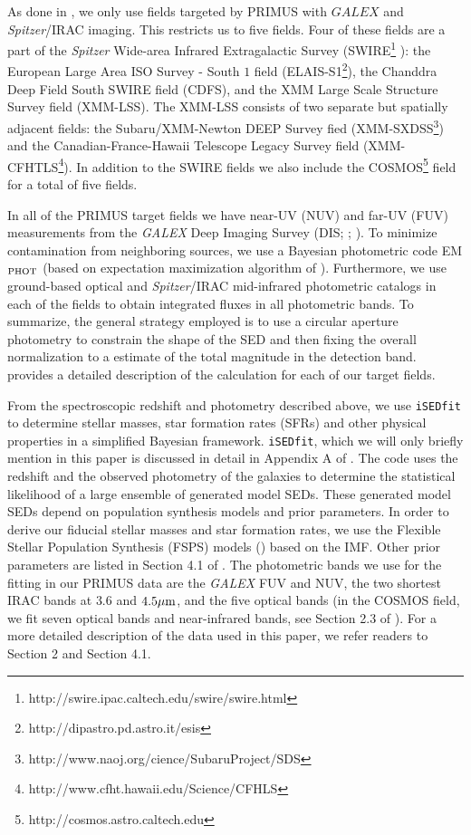 \documentclass{emulateapj}
\begin{document}
As done in \cite{Moustakas:2013aa}, we only use fields targeted by PRIMUS with $GALEX$ and {\em Spitzer}/IRAC imaging.
This restricts us to five fields.
Four of these fields are a part of the {\em Spitzer} Wide-area Infrared Extragalactic Survey (SWIRE\footnote{http://swire.ipac.caltech.edu/swire/swire.html} ): 
the European Large Area ISO Survey - South $1$ field (ELAIS-S1\footnote{http://dipastro.pd.astro.it/esis}), the Chanddra Deep Field South SWIRE field (CDFS), 
and the XMM Large Scale Structure Survey field (XMM-LSS).
The XMM-LSS consists of two separate but spatially adjacent fields: the Subaru/XMM-Newton DEEP Survey fied (XMM-SXDSS\footnote{http://www.naoj.org/cience/SubaruProject/SDS})
and the Canadian-France-Hawaii Telescope Legacy Survey field (XMM-CFHTLS\footnote{http://www.cfht.hawaii.edu/Science/CFHLS}).
In addition to the SWIRE fields we also include the COSMOS\footnote{http://cosmos.astro.caltech.edu} field for a total of five fields. 

In all of the PRIMUS target fields we have near-UV (NUV) and far-UV (FUV) measurements from the {\em GALEX} Deep Imaging Survey (DIS; \cite{Martin:2005aa}; \cite{Morrissey:2005aa}). 
To minimize contamination from neighboring sources, we use a Bayesian photometric code EM$_{\rm{PHOT}}$ (based on expectation maximization algorithm of \cite{Guillaume:2006aa}). 
Furthermore, we use ground-based optical and {\em Spitzer}/IRAC mid-infrared photometric catalogs in each of the fields to obtain integrated fluxes in all 
photometric bands.
To summarize, the general strategy employed is to use a circular aperture photometry to constrain the shape of the SED and then fixing the overall normalization to 
a estimate of the total magnitude in the detection band. 
\cite{Moustakas:2013aa} provides a detailed description of the calculation for each of our target fields.  

From the spectroscopic redshift and photometry described above, we use \texttt{iSEDfit} to determine stellar masses, star formation rates (SFRs) and other physical properties
in a simplified Bayesian framework.
\texttt{iSEDfit}, which we will only briefly mention in this paper is discussed in detail in Appendix A of \cite{Moustakas:2013aa}.
The code uses the redshift and the observed photometry of the galaxies to determine the statistical likelihood of a large ensemble of generated model SEDs. 
These generated model SEDs depend on population synthesis models and prior parameters.
In order to derive our fiducial stellar masses and star formation rates, we use the Flexible Stellar Population Synthesis (FSPS) models (\cite{Conroy:2010aa}) based on the \cite{Chabrier:2003aa} IMF. 
Other prior parameters are listed in Section 4.1 of \cite{Moustakas:2013aa}. 
The photometric bands we use for the fitting in our PRIMUS data are the {\em GALEX} FUV and NUV, the two shortest IRAC bands at $3.6$ and $4.5 \mu \rm{m}$, and the five optical bands
(in the COSMOS field, we fit seven optical bands and near-infrared bands, see Section 2.3 of \cite{Moustakas:2013aa}).
For a more detailed description of the data used in this paper, we refer readers to \cite{Moustakas:2013aa} Section 2 and Section 4.1.
\end{document}
